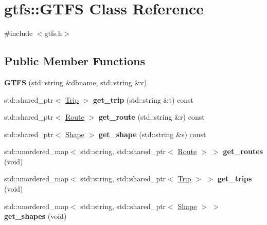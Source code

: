 \hypertarget{classgtfs_1_1GTFS}{}\section{gtfs\+:\+:G\+T\+FS Class Reference}
\label{classgtfs_1_1GTFS}


{\ttfamily \#include $<$gtfs.\+h$>$}

\subsection*{Public Member Functions}
\begin{DoxyCompactItemize}
\item 
\mbox{\label{classgtfs_1_1GTFS_abe065541610fe5d9673bc4befd0bcf94}} 
{\bfseries G\+T\+FS} (std\+::string \&dbname, std\+::string \&v)
\item 
\mbox{\label{classgtfs_1_1GTFS_aec86fae3dee1e13f541798266fb2317e}} 
std\+::shared\+\_\+ptr$<$ \hyperlink{classgtfs_1_1Trip}{Trip} $>$ {\bfseries get\+\_\+trip} (std\+::string \&t) const
\item 
\mbox{\label{classgtfs_1_1GTFS_a47cfbb8ca6cb8986e95f1038dcc7c04b}} 
std\+::shared\+\_\+ptr$<$ \hyperlink{classgtfs_1_1Route}{Route} $>$ {\bfseries get\+\_\+route} (std\+::string \&r) const
\item 
\mbox{\label{classgtfs_1_1GTFS_a59d1a7209999120b2446298f9fac4564}} 
std\+::shared\+\_\+ptr$<$ \hyperlink{classgtfs_1_1Shape}{Shape} $>$ {\bfseries get\+\_\+shape} (std\+::string \&s) const
\item 
\mbox{\label{classgtfs_1_1GTFS_aef6a88c15cdf8bf788e41c81a14ecc76}} 
std\+::unordered\+\_\+map$<$ std\+::string, std\+::shared\+\_\+ptr$<$ \hyperlink{classgtfs_1_1Route}{Route} $>$ $>$ {\bfseries get\+\_\+routes} (void)
\item 
\mbox{\label{classgtfs_1_1GTFS_ad526fc627fe1ce81b8a669f6187be0c0}} 
std\+::unordered\+\_\+map$<$ std\+::string, std\+::shared\+\_\+ptr$<$ \hyperlink{classgtfs_1_1Trip}{Trip} $>$ $>$ {\bfseries get\+\_\+trips} (void)
\item 
\mbox{\label{classgtfs_1_1GTFS_a91ada6a3f02e3ee9b6a723a6c6fc50af}} 
std\+::unordered\+\_\+map$<$ std\+::string, std\+::shared\+\_\+ptr$<$ \hyperlink{classgtfs_1_1Shape}{Shape} $>$ $>$ {\bfseries get\+\_\+shapes} (void)
\end{DoxyCompactItemize}


